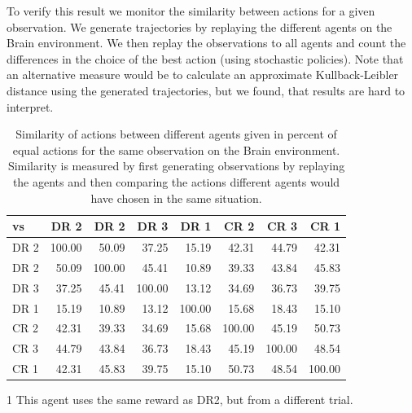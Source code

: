 To verify this result we monitor the similarity between actions for a given observation. We generate trajectories by replaying the different agents on the Brain environment. We then replay the observations to all agents and count the differences in the choice of the best action (using stochastic policies). Note that an alternative measure would be to calculate an approximate Kullback-Leibler distance using the generated trajectories, but we found, that results are hard to interpret.

\begin{table}[htp]
    \begin{center}
        \begin{threeparttable}
            \begin{tabular}{l|rrrrrrr}
                \toprule
                vs & DR 2 & DR 2\tnote{1} & DR 3 & DR 1 & CR 2 & CR 3 & CR 1 \\
                \midrule
                DR 2 & 100.00 & 50.09 & 37.25 & 15.19 & 42.31 & 44.79 & 42.31 \\
                DR 2\tnote{1} & 50.09 & 100.00 & 45.41 & 10.89 & 39.33 & 43.84 & 45.83 \\
                DR 3 & 37.25 & 45.41 & 100.00 & 13.12 & 34.69 & 36.73 & 39.75 \\
                DR 1 & 15.19 & 10.89 & 13.12 & 100.00 & 15.68 & 18.43 & 15.10 \\
                CR 2 & 42.31 & 39.33 & 34.69 & 15.68 & 100.00 & 45.19 & 50.73 \\
                CR 3 & 44.79 & 43.84 & 36.73 & 18.43 & 45.19 & 100.00 & 48.54 \\
                CR 1 & 42.31 & 45.83 & 39.75 & 15.10 & 50.73 & 48.54 & 100.00 \\
                \bottomrule
            \end{tabular}
            \begin{tablenotes} \footnotesize
                \item[1] This agent uses the same reward as DR2, but from a different trial.
            \end{tablenotes}
        \end{threeparttable}
    \end{center}
    \caption[Agent Action Similarity for Different Rewards]{Similarity of actions between different agents given in percent of equal actions for the same observation on the Brain environment. Similarity is measured by first generating observations by replaying the agents and then comparing the actions different agents would have chosen in the same situation.} \label{tab:Maze0122/Reward/Similarity}
\end{table}

